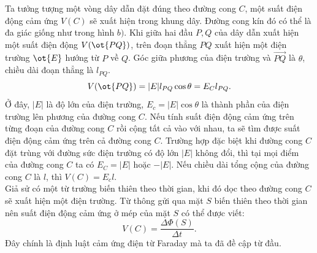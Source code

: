 \begin{vd}
\begin{center}
\end{center}
Ta tưởng tượng một vòng dây dẫn đặt đúng theo đường cong $C$, một suất điện động cảm ứng ${V}({C})$ sẽ xuất hiện trong khung dây. Đường cong kín đó có thể là đa giác giống như trong hình $b)$. Khi giữa hai đầu ${P}, {Q}$ của dây dẫn xuất hiện một suất điện động $V(\ot{PQ})$, trên đoạn thẳng ${PQ}$ xuất hiện một điện trường $\ot{E}$ hướng từ ${P}$ về ${Q}$. Góc giữa phương của điện trường và $\overrightarrow{PQ}$ là $\theta$, chiều dài đoạn thẳng là $l_{PQ}$.
\[V(\ot{PQ}) = |E| l_{PQ} \cos \theta = E_{C} l_{P Q}.\]
Ở đây, $|E|$ là độ lớn của điện trường, $E_{c}=|E| \cos \theta$ là thành phần của điện trường lên phương của đường cong ${C}$. Nếu tính suất điện động cảm ứng trên từng đoạn của đường cong ${C}$ rồi cộng tất cả vào với nhau, ta sẽ tìm được suất điện động cảm ứng trên cả đường cong ${C}$. Trường hợp đặc biệt khi đường cong ${C}$ đặt trùng với đường sức điện trường có độ lớn $|E|$ không đổi, thì tại mọi điểm của đường cong ${C}$ ta có $E_{C} = |E|$ hoặc $-|E|$. Nếu chiều dài tổng cộng của đường cong ${C}$ là $l$, thì ${V}({C}) = E_{c} l$.\\
Giả sử có một từ trường biến thiên theo thời gian, khi đó dọc theo đường cong $C$ sẽ xuất hiện một điện trường. Từ thông gửi qua mặt ${S}$ biến thiên theo thời gian nên suất điện động cảm ứng ở mép của mặt ${S}$ có thể được viết:
\[
{V}({C})=\dfrac{\Delta \Phi(S)}{\Delta t}.
\tag{1}\label{q.d.1}\]
Đây chính là định luật cảm ứng điện từ Faraday mà ta đã đề cập từ đầu.\\


\end{vd}
